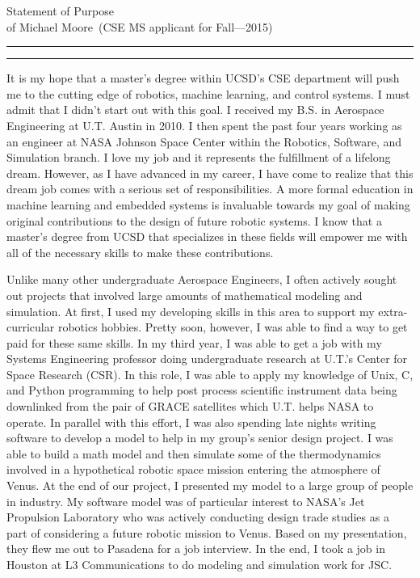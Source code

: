 \documentclass{article}
\newcommand{\soptitle}{Statement of Purpose}
\newcommand{\yourname}{Michael Moore}
\begin{document}
\begin{center}\LARGE\soptitle\\
\large of \yourname\ (CSE MS applicant for Fall---2015)
\end{center}

\hrule
\vspace{1pt}
\hrule height 1pt

\bigskip

It is my hope that a master's degree within UCSD's CSE department will push me
to the cutting edge of robotics, machine learning, and control
systems. I must admit that I didn't start out with this goal. I received my B.S. in Aerospace Engineering at U.T. Austin in 2010. I then spent the past four years working as 
an engineer at NASA Johnson Space Center within the Robotics, Software, and Simulation branch. I love my job
and it represents the fulfillment of a lifelong dream. However, as I have advanced in
my career, I have come to realize that this dream job comes with a serious set of responsibilities.
A more formal education in machine learning and embedded systems is invaluable towards my goal of making original contributions to the design of future robotic systems. I know that a master's degree from UCSD that specializes in these fields will empower me with all of the necessary skills to make these contributions.

Unlike many other undergraduate Aerospace Engineers, I often actively sought out projects that involved
large amounts of mathematical modeling and simulation. At first, I used my developing skills in this area to support my extra-curricular robotics hobbies. Pretty soon, however, I was able to find a way to get paid for these same skills. In my third year, I was able to get a job with my Systems Engineering professor doing undergraduate research at U.T.'s Center for Space Research (CSR). In this role, I was able to apply my knowledge of Unix, C, and Python programming to help post process scientific instrument data being downlinked
from the pair of GRACE satellites which U.T. helps NASA to operate. In parallel with this effort,
I was also spending late nights writing software to develop a model to help in my group's senior design project.
I was able to build a math model and then simulate some of the thermodynamics involved in a hypothetical
robotic space mission entering the atmosphere of Venus. At the end of our project, I presented my model to a
large group of people in industry. My software model was of particular interest to NASA's Jet Propulsion
Laboratory who was actively conducting design trade studies as a part of considering a future robotic 
mission to Venus. Based on my presentation, they flew me out to Pasadena for a job interview. In the end,
I took a job in Houston at L3 Communications to do modeling and simulation work for JSC. 
\end{document}
